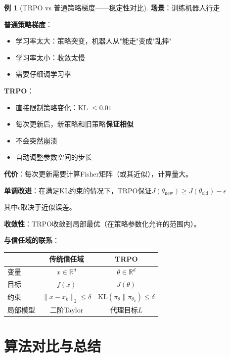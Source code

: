 \documentclass[11pt,a4paper]{article}
\theoremstyle{definition}
\newtheorem{example}{例}[section]
\begin{document}
\begin{example}[TRPO vs 普通策略梯度——稳定性对比]
\textbf{场景}：训练机器人行走

\textbf{普通策略梯度}：
\begin{itemize}
    \item 学习率太大：策略突变，机器人从"能走"变成"乱摔"
    \item 学习率太小：收敛太慢
    \item 需要仔细调学习率
\end{itemize}

\textbf{TRPO}：
\begin{itemize}
    \item 直接限制策略变化：KL $\leq 0.01$
    \item 每次更新后，新策略和旧策略\textbf{保证相似}
    \item 不会突然崩溃
    \item 自动调整参数空间的步长
\end{itemize}

\textbf{代价}：每次更新需要计算Fisher矩阵（或其近似），计算量大。
\end{example}

\begin{keypoint}[TRPO的理论保证]
\textbf{单调改进}：在满足KL约束的情况下，TRPO保证$J(\theta_{\text{new}}) \geq J(\theta_{\text{old}}) - \epsilon$

其中$\epsilon$取决于近似误差。

\textbf{收敛性}：TRPO收敛到局部最优（在策略参数化允许的范围内）。

\textbf{与信任域的联系}：
\begin{center}
\begin{tabular}{l|c|c}
\toprule
& 传统信任域 & TRPO \\
\midrule
变量 & $x \in \mathbb{R}^d$ & $\theta \in \mathbb{R}^d$ \\
目标 & $f(x)$ & $J(\theta)$ \\
约束 & $\|x - x_k\|_2 \leq \delta$ & $\text{KL}(\pi_\theta \| \pi_{\theta_k}) \leq \delta$ \\
局部模型 & 二阶Taylor & 代理目标$L$ \\
\bottomrule
\end{tabular}
\end{center}
\end{keypoint}

\section{算法对比与总结}
\end{document}
